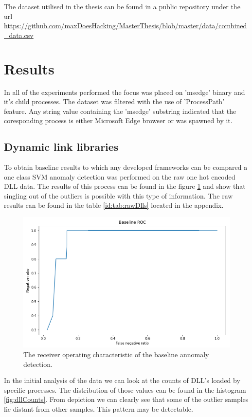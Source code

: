 \documentclass[a4paper,twoside,12pt]{book}
\begin{document}
The dataset utilised in the thesis can be found in a public repository under the url 
\url{https://github.com/maxDoesHacking/MasterThesis/blob/master/data/combined_data.csv}


\section{Results}

In all of the experiments performed the focus was placed on 'msedge' binary and it's child processes.
The dataset was filtered with the use of 'ProcessPath' feature. Any string value containing the 'msedge'
substring indicated that the coresponding process is either Microsoft Edge browser or was spawned by it. 

\subsection{Dynamic link libraries}
To obtain baseline results to which any developed frameworks can be compared a one class SVM anomaly 
detection was performed on the raw one hot encoded DLL data. The results of this process can be found
in the figure \ref{fig:DLLBaselineROC} and show that singling out of the outliers is possible with this type 
of information. The raw results can be found in the table \ref{id:tab:rawDlls} located in the appendix. 

\begin{figure}
	\centering
	\includegraphics{images/DLLBaselineROC}
	\caption{The receiver operating characteristic of the baseline annomaly detection.}
	\label{fig:DLLBaselineROC}
 \end{figure}
	
In the initial analysis of the data we can look at the counts of DLL's loaded by specific 
processes. The distribution of those values can be found in the histogram \ref{fig:dllCounts}. 
From depiction we can clearly see that some of the outlier samples lie distant from other 
samples. This pattern may be detectable. 
\end{document}
